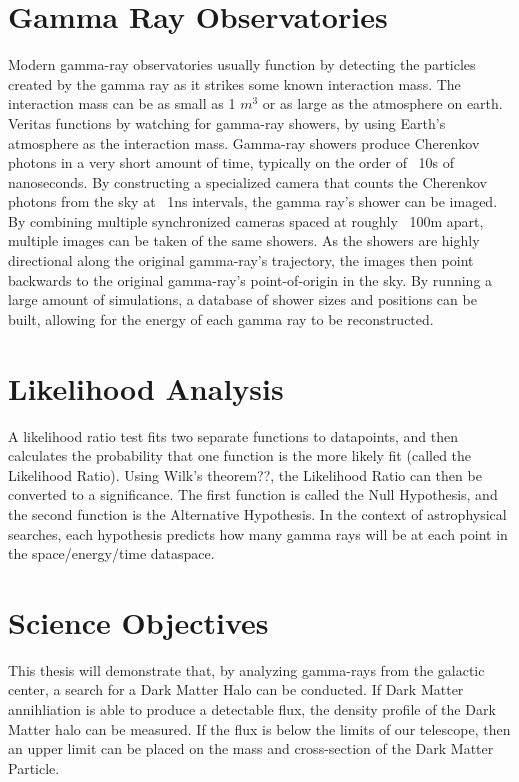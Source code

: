 \section{Gamma Ray Observatories}
Modern gamma-ray observatories usually function by detecting the particles created by the gamma ray as it strikes some known interaction mass.
The interaction mass can be as small as 1 $m^3$ or as large as the atmosphere on earth.
Veritas functions by watching for gamma-ray showers, by using Earth's atmosphere as the interaction mass.
Gamma-ray showers produce Cherenkov photons in a very short amount of time, typically on the order of ~10s of nanoseconds.
By constructing a specialized camera that counts the Cherenkov photons from the sky at ~1ns intervals, the gamma ray's shower can be imaged.
By combining multiple synchronized cameras spaced at roughly ~100m apart, multiple images can be taken of the same showers.
As the showers are highly directional along the original gamma-ray's trajectory, the images then point backwards to the original gamma-ray's point-of-origin in the sky.
By running a large amount of simulations, a database of shower sizes and positions can be built, allowing for the energy of each gamma ray to be reconstructed.

\section{Likelihood Analysis}

A likelihood ratio test fits two separate functions to datapoints, and then calculates the probability that one function is the more likely fit (called the Likelihood Ratio).
Using Wilk's theorem??, the Likelihood Ratio can then be converted to a significance.
The first function is called the Null Hypothesis, and the second function is the Alternative Hypothesis.
In the context of astrophysical searches, each hypothesis predicts how many gamma rays will be at each point in the space/energy/time dataspace.

\section{Science Objectives}
This thesis will demonstrate that, by analyzing gamma-rays from the galactic center, a search for a Dark Matter Halo can be conducted.
If Dark Matter annihliation is able to produce a detectable flux, the density profile of the Dark Matter halo can be measured.
If the flux is below the limits of our telescope, then an upper limit can be placed on the mass and cross-section of the Dark Matter Particle.

